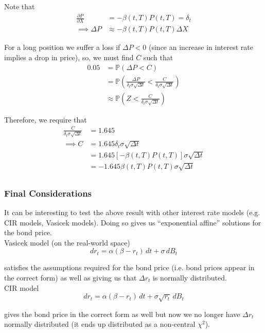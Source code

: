 \documentclass[12pt]{article}
\newlength\tindent
\renewcommand{\indent}{\hspace*{\tindent}}
\renewcommand{\P}{\mathbb P}
\begin{document}
Note that
\begin{align*}
	\frac{\partial P}{\partial X} &= -\beta(t, T)P(t, T) = \delta_t \\
	\implies \Delta P &\approx -\beta(t, T)P(t, T)\Delta X
\end{align*}

\indent For a long position we suffer a loss if $\Delta P < 0$ (since an increase in interest rate implies a drop in price), so, we must find $C$ such that
\begin{align*}
	0.05 &= \P( \Delta P < C ) \\
	&= \P \left( \frac{ \Delta P }{ \delta_t \sigma \sqrt{\Delta t} } < \frac{ C }{ \delta_t \sigma \sqrt{\Delta t} } \right) \\
	&\approx \P \left( Z < \frac{ C }{ \delta_t \sigma \sqrt{\Delta t} } \right) 
\end{align*}

Therefore, we require that
\begin{align*}
	\frac{ C }{ \delta_t \sigma \sqrt{\Delta t} } &= 1.645 \\
	\implies C &= 1.645\delta_t \sigma\sqrt{\Delta t} \\
	&= 1.645 \left[ -\beta(t, T)P(t, T) \right] \sigma \sqrt{\Delta t} \\
	&= -1.645 \beta(t, T)P(t, T) \sigma \sqrt{\Delta t} \\
\end{align*}

\subsubsection{Final Considerations}

\indent It can be interesting to test the above result with other interest rate models (e.g. CIR models, Vasicek models). Doing so gives us ``exponential affine'' solutions for the bond price. \\

Vasicek model (on the real-world space)
\begin{equation*}
	dr_t = \alpha(\beta - r_t)\,dt + \sigma\,dB_t
\end{equation*}

satisfies the assumptions required for the bond price (i.e. bond prices appear in the correct form) as well as giving us that $\Delta r_t$ is normally distributed. \\

CIR model
\begin{equation*}
	dr_t = \alpha(\beta - r_t)\,dt + \sigma\sqrt{r_t}\,dB_t
\end{equation*}

gives the bond price in the correct form as well but now we no longer have $\Delta r_t$ normally distributed (it ends up distributed as a non-central $\chi^2$).
\end{document}
